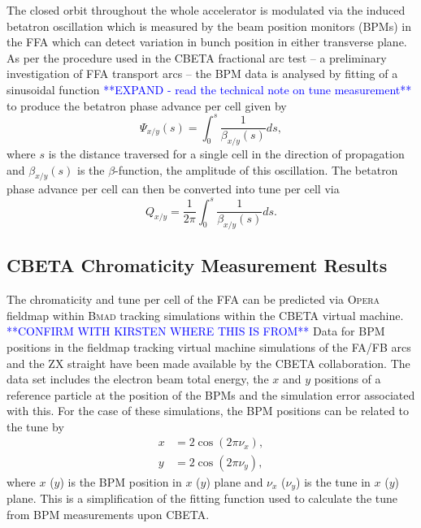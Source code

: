 \documentclass[../main.tex]{subfiles}
\begin{document}
The closed orbit throughout the whole accelerator is modulated via the induced betatron oscillation which is measured by the beam position monitors (BPMs) in the FFA which can detect variation in bunch position in either transverse plane. As per the procedure used in the CBETA fractional arc test \cite{gulliford2019beam} -- a preliminary investigation of FFA transport arcs -- the BPM data is analysed by fitting of a sinusoidal function \textcolor{blue}{**EXPAND - read the technical note on tune measurement**} to produce the betatron phase advance per cell given by
\begin{equation}
\Psi_{x/y}\left(s\right) = \int_{0}^{s}\frac{1}{\beta_{x/y}\left(s\right)}ds,
\label{eq:betatron_phase_advance_per_cell}
\end{equation}
where $s$ is the distance traversed for a single cell in the direction of propagation and $\beta_{x/y}\left(s\right)$ is the $\beta$-function, the amplitude of this oscillation. The betatron phase advance per cell can then be converted into tune per cell via 
\begin{equation}
Q_{x/y} = \frac{1}{2\pi}\int_{0}^{s} \frac{1}{\beta_{x/y}\left(s\right)}ds.
\label{eq:tune_definition}
\end{equation}

\subsection{CBETA Chromaticity Measurement Results}
\label{sec:CBETA_chromaticity_measurement_results}

The chromaticity and tune per cell of the FFA can be predicted via \textsc{Opera} fieldmap within \textsc{Bmad} tracking simulations within the CBETA virtual machine. \textcolor{blue}{**CONFIRM WITH KIRSTEN WHERE THIS IS FROM**} Data for BPM positions in the fieldmap tracking virtual machine simulations of the FA/FB arcs and the ZX straight have been made available by the CBETA collaboration. The data set includes the electron beam total energy, the $x$ and $y$ positions of a reference particle at the position of the BPMs and the simulation error associated with this. For the case of these simulations, the BPM positions can be related to the tune by 
\begin{align}
x &= 2\cos\left(2\pi\nu_{x}\right), \\
y &= 2\cos\left(2\pi\nu_{y}\right),
\label{eq:bpm_tune_conversion_fieldmap}
\end{align}
where $x$ ($y$) is the BPM position in $x$ ($y$) plane and $\nu_{x}$ ($\nu_{y}$) is the tune in $x$ ($y$) plane. This is a simplification of the fitting function \cite{gulliford2019beam} used to calculate the tune from BPM measurements upon CBETA.
\end{document}
